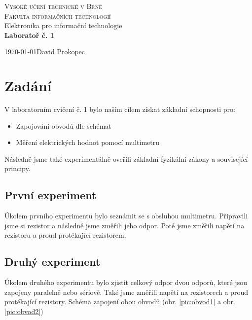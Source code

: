 \documentclass[11pt,a4paper,titlepage]{article}
\begin{document}
\begin{titlepage}
\begin{center}
                      
{\Huge\textsc{ Vysoké učení technické v Brně }}\\
\bigskip
{\LARGE\textsc{ Fakulta informačních technologií }}\\
\bigskip
{}
{\LARGE{Elektronika pro informační technologie}\\
\medskip
\textbf{\Huge Laboratoř č. 1}}

\end{center}
{\Large\today \hfill David Prokopec}
\end{titlepage}
    

\section{Zadání}

V laboratorním cvičení č. 1 bylo naším cílem získat základní schopnosti pro:

\begin{itemize}
  \item Zapojování obvodů dle schémat
  \item Měření elektrických hodnot pomocí multimetru
\end{itemize}

\noindent Následně jsme také experimentálně oveřili základní fyzikální zákony a související principy.

\subsection{První experiment}
Úkolem prvního experimentu bylo seznámit se s obsluhou multimetru. Připravili jsme si rezistor a následně jsme změřili jeho odpor. Poté jsme změřili napětí na rezistoru a proud protékající rezistorem.

\subsection{Druhý experiment}
Úkolem druhého experimentu bylo zjistit celkový odpor dvou odporů, které jsou zapojeny paralelně nebo sériově. Také jsme změřili napětí na rezistorech a proud protékající rezistory.
Schéma zapojení obou obvodů (obr. \ref{pic:obvod1} a obr. \ref{pic:obvod2})
\end{document}

